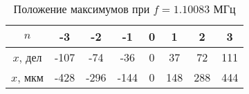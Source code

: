 \begin{table}[h!]
    \centering
    \begin{tabular}{|c|c|c|c|c|c|c|c|}
    \hline
    $n$      & -3   & -2   & -1   & 0 & 1   & 2   & 3   \\ \hline
    $x$, дел & -107 & -74  & -36  & 0 & 37  & 72  & 111 \\ \hline
    $x$, мкм & -428 & -296 & -144 & 0 & 148 & 288 & 444 \\ \hline
    \end{tabular}
    \caption{Положение максимумов при $f = 1.10083$ МГц}
    \label{tab:frequency3}
\end{table}